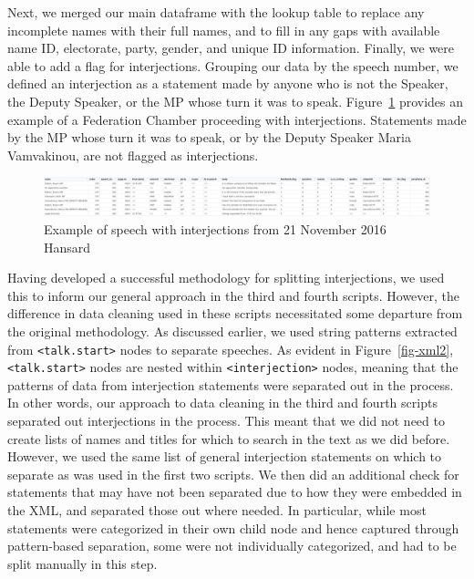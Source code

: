 \documentclass[
  letterpaper,
  DIV=11,
  numbers=noendperiod]{scrartcl}
\begin{document}
Next, we merged our main dataframe with the lookup table to replace any
incomplete names with their full names, and to fill in any gaps with
available name ID, electorate, party, gender, and unique ID information.
Finally, we were able to add a flag for interjections. Grouping our data
by the speech number, we defined an interjection as a statement made by
anyone who is not the Speaker, the Deputy Speaker, or the MP whose turn
it was to speak. Figure~\ref{fig-interject} provides an example of a
Federation Chamber proceeding with interjections. Statements made by the
MP whose turn it was to speak, or by the Deputy Speaker Maria
Vamvakinou, are not flagged as interjections.

\begin{figure}

{\centering \includegraphics{interject_ex.jpg}

}

\caption{\label{fig-interject}Example of speech with interjections from
21 November 2016 Hansard}

\end{figure}

Having developed a successful methodology for splitting interjections,
we used this to inform our general approach in the third and fourth
scripts. However, the difference in data cleaning used in these scripts
necessitated some departure from the original methodology. As discussed
earlier, we used string patterns extracted from
\texttt{\textless{}talk.start\textgreater{}} nodes to separate speeches.
As evident in Figure~\ref{fig-xml2},
\texttt{\textless{}talk.start\textgreater{}} nodes are nested within
\texttt{\textless{}interjection\textgreater{}} nodes, meaning that the
patterns of data from interjection statements were separated out in the
process. In other words, our approach to data cleaning in the third and
fourth scripts separated out interjections in the process. This meant
that we did not need to create lists of names and titles for which to
search in the text as we did before. However, we used the same list of
general interjection statements on which to separate as was used in the
first two scripts. We then did an additional check for statements that
may have not been separated due to how they were embedded in the XML,
and separated those out where needed. In particular, while most
statements were categorized in their own child node and hence captured
through pattern-based separation, some were not individually
categorized, and had to be split manually in this step.
\end{document}
